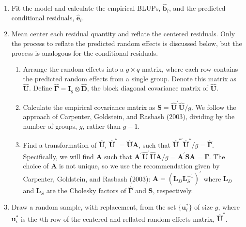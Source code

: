 \begin{enumerate}
\def\labelenumi{\arabic{enumi}.}
\item
  Fit the model and calculate the empirical BLUPs, \(\widehat{\boldsymbol{b}}_i\), and the
  predicted conditional residuals, \(\widehat{\boldsymbol{e}}_i\).
\item
  Mean center each residual quantity and reflate the centered
  residuals. Only the process to reflate the predicted random effects is discussed below, but the process is analogous for the conditional residuals.

  \begin{enumerate}
  \def\labelenumii{\roman{enumii}.}
  \tightlist
  \item
    Arrange the random effects into a \(g \times q\) matrix, where each row contains the predicted random effects from a single group. Denote this matrix as \(\widehat{\boldsymbol{U}}\). Define \(\boldsymbol{\widehat{\Gamma}} = \boldsymbol{I}_g \otimes \widehat{\boldsymbol{D}}\), the block diagonal covariance matrix of \(\widehat{\boldsymbol{U}}\).
  \item
    Calculate the empirical covariance matrix as \(\boldsymbol{S} = \widehat{\boldsymbol{U}}^\prime \widehat{\boldsymbol{U}} / g\). We follow the approach of Carpenter, Goldstein, and Rasbash (2003), dividing by the number of groups, \(g\), rather than \(g-1\).
  \item
    Find a transformation of \(\widehat{\boldsymbol{U}}\), \(\widehat{\boldsymbol{U}}^* = \widehat{\boldsymbol{U}} \boldsymbol{A}\), such that \(\widehat{\boldsymbol{U}}^{*\prime} \widehat{\boldsymbol{U}}^* / g = \boldsymbol{\widehat{\Gamma}}\). Specifically, we will find \(\boldsymbol{A}\) such that \(\boldsymbol{A}^\prime \widehat{\boldsymbol{U}}^\prime \widehat{\boldsymbol{U}} \boldsymbol{A} / g = \boldsymbol{A}^\prime \boldsymbol{SA} = \boldsymbol{\widehat{\Gamma}}\). The choice of \(\boldsymbol{A}\) is not unique, so we use the recommendation given by Carpenter, Goldstein, and Rasbash (2003): \(\boldsymbol{A} = \left(\boldsymbol{L}_D \boldsymbol{L}_S^{-1} \right)^\prime\) where \(\boldsymbol{L}_D\) and \(\boldsymbol{L}_S\) are the Cholesky factors of \(\boldsymbol{\widehat{\Gamma}}\) and \(\boldsymbol{S}\), respectively.
  \end{enumerate}
\item
  Draw a random sample, with replacement, from the set \(\lbrace \boldsymbol{u}_i^* \rbrace\) of size \(g\), where \(\boldsymbol{u}_i^*\) is the \(i\)th row of the centered and reflated random effects matrix, \(\widehat{\boldsymbol{U}}^*\).

\end{enumerate}
